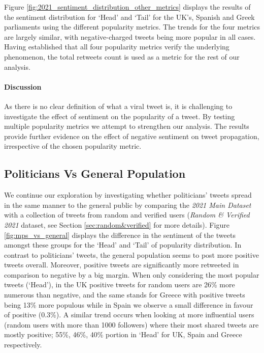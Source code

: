 Figure \ref{fig:2021_sentiment_distribution_other_metrics} displays the results of the sentiment distribution for `Head' and `Tail' for the UK's, Spanish and Greek parliaments using the different popularity metrics.
The trends for the four metrics are largely similar, with negative-charged tweets being more popular in all cases. Having established that all four popularity metrics verify the underlying phenomenon, the total retweets count is used as a metric for the rest of our analysis.

\vspace{-10pt}
\paragraph{Discussion} As there is no clear definition of what a viral tweet is, it is challenging to investigate the effect of sentiment on the popularity of a tweet. By testing multiple popularity metrics we attempt to strengthen our analysis. The results provide further evidence on the effect of negative sentiment on tweet propagation, irrespective of the chosen popularity metric.


\subsection{Politicians Vs General Population}\label{sec:mps_vs_general}

We continue our exploration by investigating whether politicians' tweets spread in the same manner to the general public by comparing the \textit{2021 Main Dataset} with a collection of tweets from random and verified users (\textit{Random \& Verified 2021} dataset, see Section \ref{sec:random&verified} for more details). Figure \ref{fig:mps_vs_general} displays the difference in the sentiment of the tweets amongst these groups for the `Head' and `Tail' of popularity distribution.
In contrast to politicians' tweets, the general population seems to post more positive tweets overall. Moreover, positive tweets are significantly more retweeted in comparison to negative by a big margin. When only considering the most popular tweets (`Head'), in the UK positive tweets for random users are 26\% more numerous than negative, and the same stands for Greece with positive tweets being 13\% more populous while in Spain we observe a small difference in favour of positive (0.3\%). A similar trend occurs when looking at more influential users (random users with more than 1000 followers) where their most shared tweets are mostly positive; 55\%, 46\%, 40\% portion in `Head' for UK, Spain and Greece respectively.



